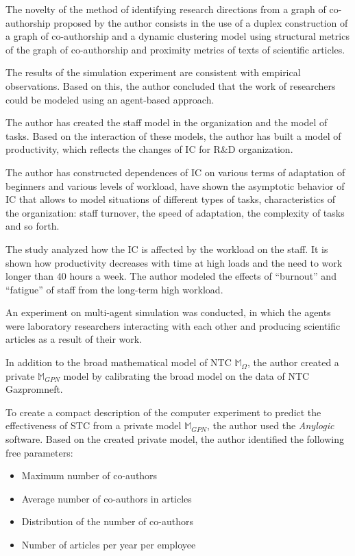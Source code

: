 \documentclass[12pt]{report}
\theoremstyle{definition}
\begin{document}
The novelty of the method of identifying research directions from a graph of co-authorship proposed by the author consists in the use of a duplex construction of a graph of co-authorship and a dynamic clustering model using structural metrics of the graph of co-authorship and proximity metrics of texts of scientific articles.

The results of the simulation experiment are consistent with empirical observations.
Based on this, the author concluded that the work of researchers could be modeled using an agent-based approach.

The author has created the staff model in the organization and the model of tasks. Based on the interaction of these models, the author has built a model of productivity, which reflects the changes of IC for R\&D organization. 

The author has constructed dependences of IC on various terms of adaptation of beginners and various levels of workload, have shown the asymptotic behavior of IC that allows to model situations of different types of tasks, characteristics of the organization: staff turnover, the speed of adaptation, the complexity of tasks and so forth. 

The study analyzed how the IC is affected by the workload on the staff. 
It is shown how productivity decreases with time at high loads and the need to work longer than 40 hours a week. 
The author modeled the effects of ``burnout'' and ``fatigue'' of staff from the long-term high workload.

An experiment on multi-agent simulation was conducted, in which the agents were laboratory researchers interacting with each other and producing scientific articles as a result of their work. 

In addition to the broad mathematical model of NTC $ \mathbb{M}_{\Omega} $, the author created a private $\mathbb{M}_{GPN}$ model by calibrating the broad model on the data of NTC Gazpromneft. 

To create a compact description of the computer experiment to predict the effectiveness of STC from a private model $\mathbb{M}_{GPN}$, the author used the \textit{Anylogic} software.
Based on the created private model, the author identified the following free parameters:

\begin{itemize}
	\item Maximum number of co-authors
	\item Average number of co-authors in articles
	\item Distribution of the number of co-authors
	\item Number of articles per year per employee
\end{itemize}
\end{document}
